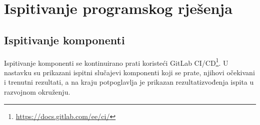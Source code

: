 			\eject 

		
	
		\section{Ispitivanje programskog rješenja}
			
%			
	
			\clearpage
			\subsection{Ispitivanje komponenti}
			
			Ispitivanje komponenti  se kontinuirano prati koristeći GitLab CI/CD\footnote{\url{https://docs.gitlab.com/ee/ci/}}. 
			U nastavku su prikazani ispitni slučajevi komponenti koji se prate, njihovi očekivani i trenutni rezultati, a na kraju potpoglavlja je prikazan rezultatizvođenja ispita u razvojnom okruženju.  \\
			
